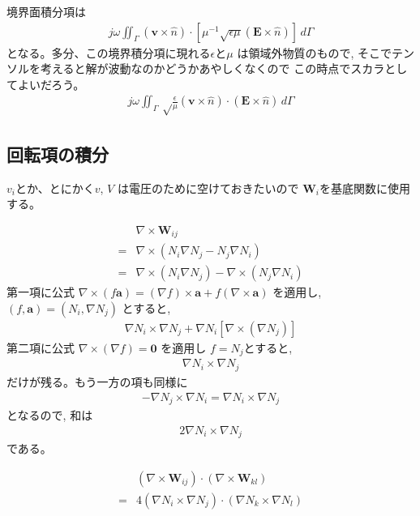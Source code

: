 境界面積分項は
\begin{align}
j\omega\iint_\Gamma
\left(\bm{v}\times\hat{n}\right)\cdot
\left[\mu^{-1}
\sqrt{\epsilon\mu}\left(\bm{E}\times\hat{n}\right)
\right]\,d\Gamma
\end{align}
となる。多分、この境界積分項に現れる$\epsilon$と$\mu$
は領域外物質のもので,
そこでテンソルを考えると解が波動なのかどうかあやしくなくので%
この時点でスカラとしてよいだろう。
\begin{align}
j\omega\iint_\Gamma\sqrt\frac{\epsilon}{\mu}
\left(\bm{v}\times\hat{n}\right)\cdot
\left(\bm{E}\times\hat{n}\right)
\,d\Gamma
\end{align}

\subsection{回転項の積分}

$v_i$とか、とにかく$v$, $V$
は電圧のために空けておきたいので
$\bm{W}_i$を基底関数に使用する。

\begin{align}
&\nabla\times\bm{W}_{ij}\\
=&\nabla\times\left(N_i\nabla N_j-N_j\nabla N_i\right)\\
=&\nabla\times\left(N_i\nabla N_j\right)
 -\nabla\times\left(N_j\nabla N_i\right)
\end{align}
第一項に公式
$\nabla\times\left(f\bm{a}\right)
=\left(\nabla f\right)\times\bm{a}
+f\left(\nabla\times\bm{a}\right)$
を適用し,
$\left(f, \bm{a}\right)
=\left(N_i, \nabla N_j\right)$
とすると,
\begin{align}
\nabla N_i\times\nabla N_j
+\nabla N_i\left[\nabla\times\left(\nabla N_j\right)\right]
\end{align}
第二項に公式
$\nabla\times\left(\nabla f\right)=\bm{0}$
を適用し
$f=N_j$とすると,
\begin{align}
\nabla N_i\times\nabla N_j
\end{align}
だけが残る。もう一方の項も同様に
\begin{align}
-\nabla N_j\times\nabla N_i = \nabla N_i\times\nabla N_j
\end{align}
となるので, 和は
\begin{align}
2\nabla N_i\times\nabla N_j
\end{align}
である。

\begin{align}
&\left(\nabla\times\bm{W}_{ij}\right)\cdot
\left(\nabla\times\bm{W}_{kl}\right)\\
=&4\left(\nabla N_i\times\nabla N_j\right)\cdot
   \left(\nabla N_k\times\nabla N_l\right)
\end{align}

